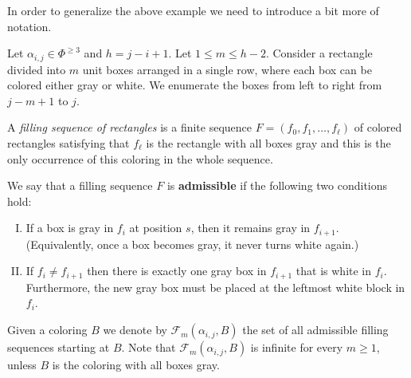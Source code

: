 In order to generalize the above example we need to introduce a bit more of notation. 

\begin{definition}\rm
Let $\alpha_{i,j}\in \Phi^{\geq 3}$ and $h=j-i+1$. 
Let $1\leq m \leq h-2$.  
Consider a rectangle divided into $m$ unit boxes arranged in a single row, where each box can be colored either gray or white.
We enumerate the boxes from left to right from $j-m+1$ to $j$.

A \emph{filling sequence of rectangles} is a finite sequence  
$ F = (f_0, f_1, \ldots, f_\ell) $
of colored rectangles satisfying that $f_\ell$  is the rectangle with all boxes gray and this is the only occurrence of this coloring in the whole sequence.

We say that a filling sequence $F$ is \textbf{admissible} if the following two conditions hold:
\begin{enumerate}[(I)]
    \item 
    If a box is gray in $f_i$ at position $s$, then it remains gray in $f_{i+1}$.  
    (Equivalently, once a box becomes gray, it never turns white again.)
    \item
    If  $f_i \neq f_{i+1}$ then there is exactly one gray box in $f_{i+1}$ that is white in $f_{i}$.  
    Furthermore, the new gray box must be placed at the  leftmost white block in $f_i$. 
\end{enumerate}

Given a coloring $B$ we denote by $\mathcal{F}_m(\alpha_{i,j},B)$ the set of  all admissible filling sequences starting at $B$. 
Note that $\mathcal{F}_m(\alpha_{i,j},B)$ is infinite for every $m \geq 1$, unless $B$ is the coloring with all boxes gray. 
\end{definition}


